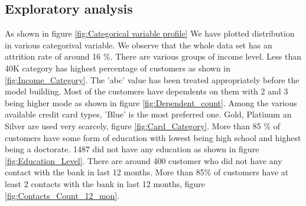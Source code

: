 \documentclass[10pt,a4paper]{style}
\begin{document}
\subsection{Exploratory analysis}	
As shown in figure \ref{fig:Categorical variable profile} We have plotted distribution in various categorival variable. We observe that the whole data set has an attrition rate of around 16 \%. There are various groups of income level. Less than 40K category has highest percentage of customers as shown in \ref{fig:Income_Category}. The 'abc' value has been treated appropriately before the model building. Most of the customers have dependents on them with 2 and 3 being higher mode as shown in figure \ref{fig:Dependent_count}. Among the various available credit card types, 'Blue' is the most preferred one. Gold, Platinum an Silver are used very scarcely, figure \ref{fig:Card_Category}. More than 85 \% of customers have some form of education with lowest being high school and highest being a doctorate. 1487 did not have any education as shown in figure \ref{fig:Education_Level}. There are around 400 customer who did not have any contact with the bank in last 12 months. More than 85\% of customers have  at least 2 contacts with the bank in last 12 months, figure \ref{fig:Contacts_Count_12_mon}. 
\end{document}
